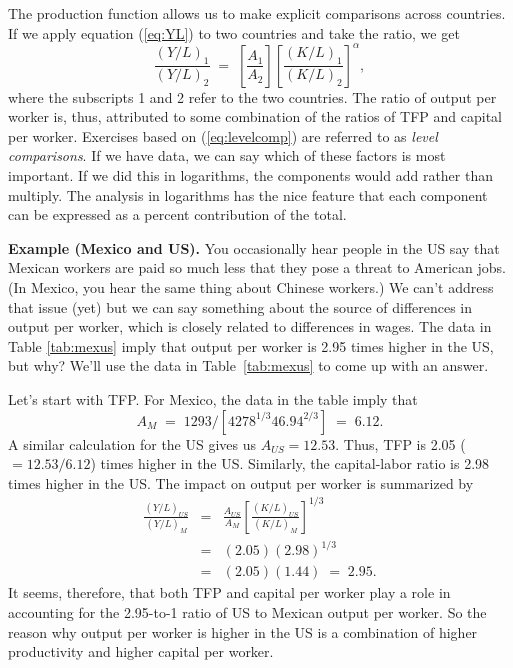 The production function allows us to make explicit
comparisons across countries.  If we apply equation (\ref{eq:YL})
to two countries  and take the ratio, we get
\begin{equation}
    \frac{(Y/L)_1}{(Y/L)_2} \;=\;
             \left[ \frac{A_1}{A_2} \right]
             \left[ \frac{(K/L)_1}{(K/L)_2} \right]^\alpha ,
        \label{eq:levelcomp}
\end{equation}
where the subscripts 1 and 2 refer to the two countries.
The ratio of output per worker is, thus, attributed to
some combination of the ratios of
TFP and capital per worker.
Exercises based on (\ref{eq:levelcomp}) are referred to as
{\it level comparisons\/}.
If we have data, we can say which of these factors is most important.
If we did this in logarithms, the components would add rather than multiply. The analysis in logarithms has the nice feature that each component can be expressed as a percent contribution of the total.


\textbf{Example (Mexico and US).} You occasionally hear
people in the US say that Mexican workers are paid so much less
that they pose a threat to American jobs. (In Mexico, you hear the
same thing about Chinese workers.) We can't address that issue (yet) but we can say something about the source of differences
in output per worker, which is closely related to differences in
wages. The data in Table \ref{tab:mexus} imply that output per
worker is 2.95 times higher in the US, but why?
We'll use the data in Table~\ref{tab:mexus} to come up with an answer.

Let's start with TFP.
For Mexico, the data in the table imply that
\[
    A_M \;=\; 1293 / [ 4278^{1/3} 46.94^{2/3} ] \;=\; 6.12.
\]
A similar calculation for the US gives us $A_{US} = 12.53$.
Thus, TFP is 2.05 ($= 12.53/6.12$) times higher in the US.
Similarly, the capital-labor ratio is 2.98 times higher in the US.
The impact on output per worker is summarized by
\begin{eqnarray*}
     \frac{(Y/L)_{US}}{(Y/L)_{M}}  &=&  \frac{A_{US}}{A_M}
                        \left[ \frac{(K/L)_{US}}{(K/L)_{M}} \right]^{1/3} \\
                         &=&   (2.05) (2.98)^{1/3} \\ %
                         &=&   (2.05) (1.44) \;=\; 2.95 . %
\end{eqnarray*}
It seems, therefore, that both TFP and capital per
worker play a role in accounting
 for the
2.95-to-1 ratio of US to Mexican output per worker.
So the reason why output per worker is higher in the US is a
combination of higher productivity and
higher capital per worker.

